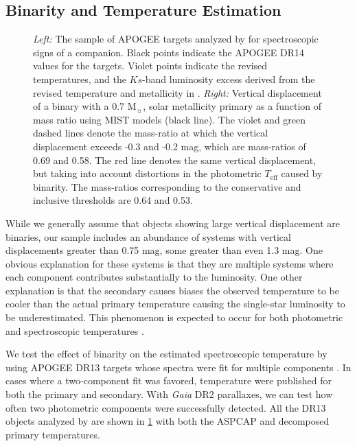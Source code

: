 \documentclass[twocolumn]{aastex6}
\newcommand{\Gaia}{\mbox{\textit{Gaia}}}
\newcommand{\Teff}{\ensuremath{T_{\textrm{eff}}}}
\begin{document}
\subsection{Binarity and Temperature Estimation}

\begin{figure}[htb]
    \centering
    \caption{\emph{Left:} The sample of APOGEE targets analyzed by \citet{ElBadry18b} for
    spectroscopic signs of a companion. Black points indicate the APOGEE DR14 
values for the targets. Violet points indicate the revised temperatures, and the
\(Ks\)-band luminosity excess derived from the revised temperature and 
metallicity in \citet{ElBadry18b}. \emph{Right:} Vertical displacement of a 
binary with a 0.7 M\(_\sun\), solar metallicity primary as a function of mass 
ratio using MIST models (black line). The violet and green dashed lines denote 
the mass-ratio at which the vertical displacement exceeds -0.3 and -0.2  mag, 
which are mass-ratios of 0.69 and 0.58. The red line denotes the same vertical 
displacement, but taking into account distortions in the photometric \Teff{} 
caused by binarity. The mass-ratios corresponding to the conservative and 
inclusive thresholds are 0.64 and 0.53. }
    \label{fig:binary_teff}
\end{figure}


While we generally assume that objects showing large vertical displacement are
binaries, our sample includes an abundance of systems with vertical
displacements greater than 0.75 mag, some greater than even 1.3 mag. One
obvious explanation for these systems is that they are multiple systems 
where each component contributes substantially to the luminosity. One other 
explanation is that the secondary causes biases the observed temperature to be 
cooler than the actual primary temperature causing the single-star luminosity 
to be underestimated. This phenomenon is expected to occur for both 
photometric and spectroscopic temperatures \citep{Pinsonneault12,ElBadry18a}. 

We test the effect of binarity on the estimated spectroscopic temperature by 
using APOGEE DR13 targets whose spectra were fit for multiple components
\citep{ElBadry18b}. In cases where a two-component fit was favored, temperature
were published for both the primary and secondary. With \Gaia{} DR2 parallaxes,
we can test how often two photometric components were successfully
detected. All the DR13 objects analyzed by \citet{ElBadry18b} are shown in
\cref{fig:binary_teff} with both the ASPCAP and decomposed primary 
temperatures.
\end{document}
